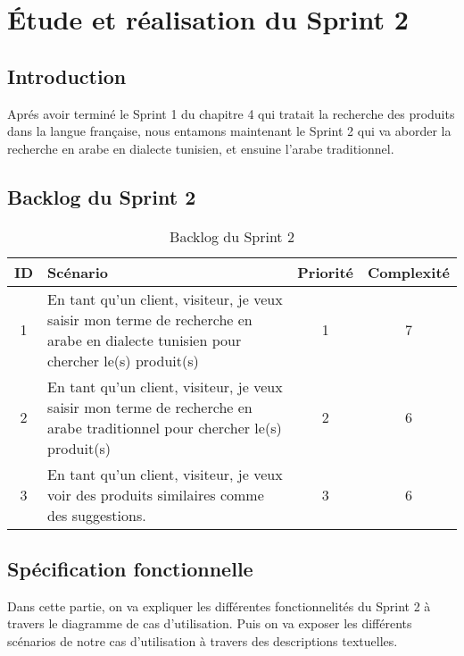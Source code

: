 \chapter{Étude et réalisation du Sprint 2}
\localtableofcontents

\newpage
\section{Introduction}
\noindent
Aprés avoir terminé le Sprint 1 du chapitre 4 qui tratait la recherche des produits dans la langue française, nous entamons maintenant le Sprint 2 qui va aborder la recherche en arabe en dialecte tunisien, et ensuine l'arabe traditionnel.

\section{Backlog du Sprint 2}
\begin{table}[H]
	\centering

	\begin{tabularx}{\textwidth}{|c|X|c|c|}
		\hline
		\rowcolor{blue!20}
		\textbf{ID} & \textbf{Scénario}                                                                                     & \textbf{Priorité} & \textbf{Complexité} \\ \hline
		1           & En tant qu'un client, visiteur, je veux saisir mon terme de recherche en arabe en dialecte tunisien pour chercher le(s) produit(s) & 1                 & 7                  \\ \hline

	2           & En tant qu'un client, visiteur, je veux saisir mon terme de recherche en arabe traditionnel pour chercher le(s) produit(s) & 2                 & 6 \\ \hline
	3           & En tant qu'un client, visiteur, je veux voir des produits similaires comme des suggestions. & 3                 & 6 \\ \hline
	\end{tabularx}
	\caption{Backlog du Sprint 2}
	\label{tab:sprint2}
\end{table}

\section{Spécification fonctionnelle}
\noindent
Dans cette partie, on va expliquer les différentes fonctionnelités du Sprint 2 à travers le diagramme de cas d'utilisation. Puis on va exposer les différents scénarios de notre cas d'utilisation à travers des descriptions textuelles.



